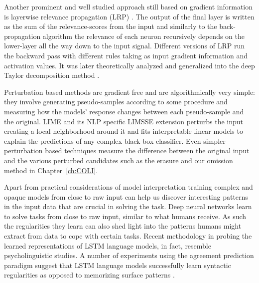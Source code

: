 Another prominent and well studied
approach still based on gradient information is layerwise
relevance propagation (LRP) \citep{bach2015pixel}. The output of the final layer
is written as the sum of the relevance-scores from the input and similarly to the back-propagation
algorithm the relevance of each neuron
recursively depends on the lower-layer all the way down to the input signal.
Different versions of LRP run the backward pass with different rules taking as
input gradient information and activation values. It was later theoretically analyzed and generalized
into the deep Taylor decomposition method \citep{binder2016layer}.


Perturbation based methods are gradient free and are algorithmically very simple: they involve generating
pseudo-samples according to some procedure and measuring how the models' response changes
between each pseudo-sample and the original.
LIME \citep{ribeiro2016should} and its NLP specific LIMSSE extension
\citep{poerner2018evaluating} perturbs
the input creating a local neighborhood around it and fits interpretable linear models to explain
the predictions of any complex black box classifier.
Even simpler perturbation based techniques measure the
difference between the original input and the various perturbed candidates such as the erasure
\citep{li2016understanding} and our omission \citep{Kadar2016} method in Chapter~\ref{ch:COLI}.

Apart from practical considerations of model interpretation training complex and opaque models
from close to raw input can help us discover interesting patterns in the input data that 
are crucial in solving the task.
Deep neural networks learn to solve tasks from close to raw input, similar to
what humans receive. As such the regularities they learn can also shed light into the patterns
humans might extract from data to cope with certain tasks.
Recent methodology in probing the learned representations of LSTM language models,
in fact, resemble psycholinguistic studies.
A number of experiments using the agreement prediction paradigm
\citep{bock1991broken} suggest that LSTM language models successfully learn
syntactic regularities as opposed to memorizing surface patterns
\citep{linzen2016assessing,enguehard2017exploring,bernardy2017using,gulordava2018colorless}.

